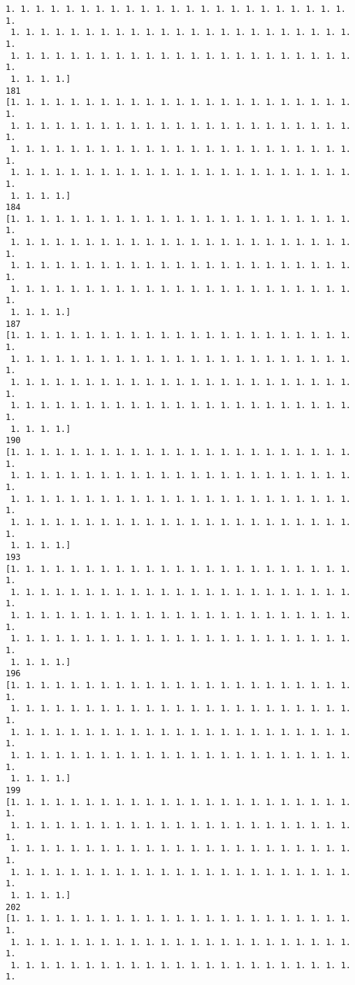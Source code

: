\documentclass[11pt]{article}
\begin{document}
\begin{Verbatim}[commandchars=\\\{\}]
 1. 1. 1. 1. 1. 1. 1. 1. 1. 1. 1. 1. 1. 1. 1. 1. 1. 1. 1. 1. 1. 1. 1. 1.
 1. 1. 1. 1. 1. 1. 1. 1. 1. 1. 1. 1. 1. 1. 1. 1. 1. 1. 1. 1. 1. 1. 1. 1.
 1. 1. 1. 1. 1. 1. 1. 1. 1. 1. 1. 1. 1. 1. 1. 1. 1. 1. 1. 1. 1. 1. 1. 1.
 1. 1. 1. 1.]
181
[1. 1. 1. 1. 1. 1. 1. 1. 1. 1. 1. 1. 1. 1. 1. 1. 1. 1. 1. 1. 1. 1. 1. 1.
 1. 1. 1. 1. 1. 1. 1. 1. 1. 1. 1. 1. 1. 1. 1. 1. 1. 1. 1. 1. 1. 1. 1. 1.
 1. 1. 1. 1. 1. 1. 1. 1. 1. 1. 1. 1. 1. 1. 1. 1. 1. 1. 1. 1. 1. 1. 1. 1.
 1. 1. 1. 1. 1. 1. 1. 1. 1. 1. 1. 1. 1. 1. 1. 1. 1. 1. 1. 1. 1. 1. 1. 1.
 1. 1. 1. 1.]
184
[1. 1. 1. 1. 1. 1. 1. 1. 1. 1. 1. 1. 1. 1. 1. 1. 1. 1. 1. 1. 1. 1. 1. 1.
 1. 1. 1. 1. 1. 1. 1. 1. 1. 1. 1. 1. 1. 1. 1. 1. 1. 1. 1. 1. 1. 1. 1. 1.
 1. 1. 1. 1. 1. 1. 1. 1. 1. 1. 1. 1. 1. 1. 1. 1. 1. 1. 1. 1. 1. 1. 1. 1.
 1. 1. 1. 1. 1. 1. 1. 1. 1. 1. 1. 1. 1. 1. 1. 1. 1. 1. 1. 1. 1. 1. 1. 1.
 1. 1. 1. 1.]
187
[1. 1. 1. 1. 1. 1. 1. 1. 1. 1. 1. 1. 1. 1. 1. 1. 1. 1. 1. 1. 1. 1. 1. 1.
 1. 1. 1. 1. 1. 1. 1. 1. 1. 1. 1. 1. 1. 1. 1. 1. 1. 1. 1. 1. 1. 1. 1. 1.
 1. 1. 1. 1. 1. 1. 1. 1. 1. 1. 1. 1. 1. 1. 1. 1. 1. 1. 1. 1. 1. 1. 1. 1.
 1. 1. 1. 1. 1. 1. 1. 1. 1. 1. 1. 1. 1. 1. 1. 1. 1. 1. 1. 1. 1. 1. 1. 1.
 1. 1. 1. 1.]
190
[1. 1. 1. 1. 1. 1. 1. 1. 1. 1. 1. 1. 1. 1. 1. 1. 1. 1. 1. 1. 1. 1. 1. 1.
 1. 1. 1. 1. 1. 1. 1. 1. 1. 1. 1. 1. 1. 1. 1. 1. 1. 1. 1. 1. 1. 1. 1. 1.
 1. 1. 1. 1. 1. 1. 1. 1. 1. 1. 1. 1. 1. 1. 1. 1. 1. 1. 1. 1. 1. 1. 1. 1.
 1. 1. 1. 1. 1. 1. 1. 1. 1. 1. 1. 1. 1. 1. 1. 1. 1. 1. 1. 1. 1. 1. 1. 1.
 1. 1. 1. 1.]
193
[1. 1. 1. 1. 1. 1. 1. 1. 1. 1. 1. 1. 1. 1. 1. 1. 1. 1. 1. 1. 1. 1. 1. 1.
 1. 1. 1. 1. 1. 1. 1. 1. 1. 1. 1. 1. 1. 1. 1. 1. 1. 1. 1. 1. 1. 1. 1. 1.
 1. 1. 1. 1. 1. 1. 1. 1. 1. 1. 1. 1. 1. 1. 1. 1. 1. 1. 1. 1. 1. 1. 1. 1.
 1. 1. 1. 1. 1. 1. 1. 1. 1. 1. 1. 1. 1. 1. 1. 1. 1. 1. 1. 1. 1. 1. 1. 1.
 1. 1. 1. 1.]
196
[1. 1. 1. 1. 1. 1. 1. 1. 1. 1. 1. 1. 1. 1. 1. 1. 1. 1. 1. 1. 1. 1. 1. 1.
 1. 1. 1. 1. 1. 1. 1. 1. 1. 1. 1. 1. 1. 1. 1. 1. 1. 1. 1. 1. 1. 1. 1. 1.
 1. 1. 1. 1. 1. 1. 1. 1. 1. 1. 1. 1. 1. 1. 1. 1. 1. 1. 1. 1. 1. 1. 1. 1.
 1. 1. 1. 1. 1. 1. 1. 1. 1. 1. 1. 1. 1. 1. 1. 1. 1. 1. 1. 1. 1. 1. 1. 1.
 1. 1. 1. 1.]
199
[1. 1. 1. 1. 1. 1. 1. 1. 1. 1. 1. 1. 1. 1. 1. 1. 1. 1. 1. 1. 1. 1. 1. 1.
 1. 1. 1. 1. 1. 1. 1. 1. 1. 1. 1. 1. 1. 1. 1. 1. 1. 1. 1. 1. 1. 1. 1. 1.
 1. 1. 1. 1. 1. 1. 1. 1. 1. 1. 1. 1. 1. 1. 1. 1. 1. 1. 1. 1. 1. 1. 1. 1.
 1. 1. 1. 1. 1. 1. 1. 1. 1. 1. 1. 1. 1. 1. 1. 1. 1. 1. 1. 1. 1. 1. 1. 1.
 1. 1. 1. 1.]
202
[1. 1. 1. 1. 1. 1. 1. 1. 1. 1. 1. 1. 1. 1. 1. 1. 1. 1. 1. 1. 1. 1. 1. 1.
 1. 1. 1. 1. 1. 1. 1. 1. 1. 1. 1. 1. 1. 1. 1. 1. 1. 1. 1. 1. 1. 1. 1. 1.
 1. 1. 1. 1. 1. 1. 1. 1. 1. 1. 1. 1. 1. 1. 1. 1. 1. 1. 1. 1. 1. 1. 1. 1.

\end{Verbatim}
\end{document}
